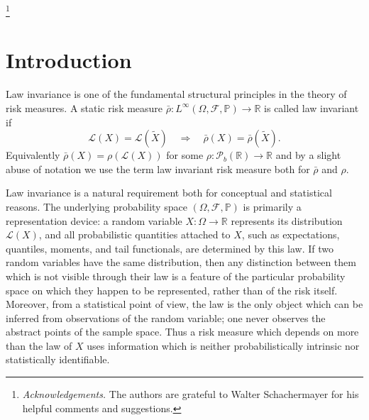 \documentclass[a4paper]{amsart}
\theoremstyle{definition}
\newcommand{\R}{\mathbb{R}}
\newcommand{\F}{\mathcal{F}}
\newcommand{\law}{\mathcal{L}}
\newcommand{\Pc}{\mathcal P}
\renewcommand{\P}{\mathbb{P}}
\begin{document}



\thanks{\textit{Acknowledgements.}  The authors are grateful to Walter Schachermayer for his helpful comments and suggestions.}


\maketitle


\section{Introduction}\label{sec:intro}

Law invariance is one of the fundamental structural principles in the theory of
risk measures. A static risk measure
\(
\bar\rho:L^\infty(\Omega,\F,\P)\to\mathbb R
\)
is called law invariant if
\[
\law(X)=\law(\widetilde X)
\quad\Longrightarrow\quad
\bar\rho(X)=\bar\rho(\widetilde X).
\]
Equivalently $\bar \rho (X) = \rho(\law (X))$ for some $\rho: \Pc_b (\R) \to \R$ and by a slight abuse of notation we use the term law invariant risk measure both for $\bar \rho$ and $\rho$. 

Law invariance is a natural requirement both for conceptual and statistical reasons. The
underlying probability space \((\Omega,\F,\P)\) is primarily a representation
device: a random variable \(X:\Omega\to\mathbb R\) represents its distribution
\(\law(X)\), and all probabilistic quantities attached to \(X\), such as
expectations, quantiles, moments, and tail functionals, are determined by this
law. If two random variables have the same distribution, then any distinction
between them which is not visible through their law is a feature of the
particular probability space on which they happen to be represented, rather
than of the risk itself. Moreover, from a statistical point of view, the law is
the only object which can be inferred from observations of the random variable;
one never observes the abstract points of the sample space. Thus a risk measure
which depends on more than the law of \(X\) uses information which is neither
probabilistically intrinsic nor statistically identifiable.
\end{document}
